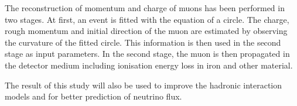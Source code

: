The reconstruction of momentum and charge of muons has been performed
in two stages. At first, an event is fitted with the equation of a
circle. The charge, rough momentum and initial direction of the muon
are estimated by observing the curvature of the fitted circle. This
information is then used in the second stage as input parameters. In
the second stage, the muon is then propagated in the detector medium
including ionisation energy loss in iron and other material.

The result of this study will also be used to improve the hadronic
interaction models and for better prediction of neutrino flux.
